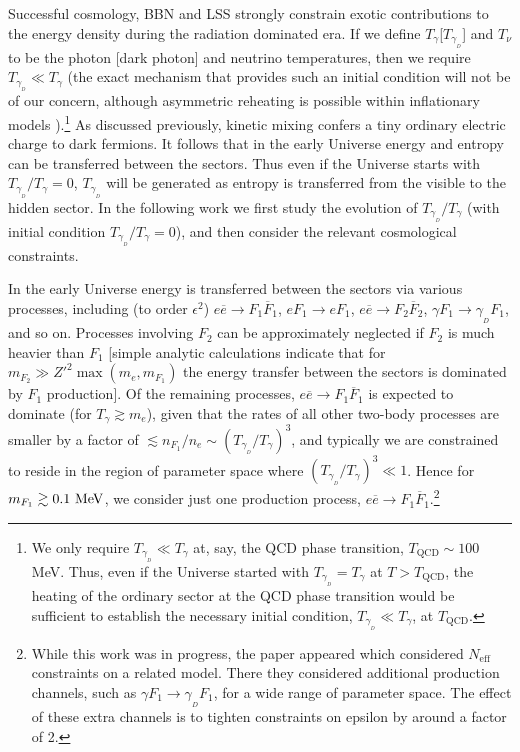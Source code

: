 \documentclass[12pt]{article}
\begin{document}
Successful cosmology, BBN and LSS strongly constrain exotic contributions to the energy density during the radiation dominated era. If we define $T _{\gamma}$[$T _{\gamma _{_D}}$] and $T _{\nu}$ to be the photon [dark photon] and neutrino temperatures, then we require $T _{\gamma _{_D}} \ll T _{\gamma}$ (the exact mechanism that provides such an initial condition will not be of our concern, although asymmetric reheating is possible within inflationary models \cite{hodges}).\footnote{We only require $T _{\gamma _{_D}} \ll T _{\gamma}$ at, say, the QCD phase transition, $T _{\text{QCD}} \sim 100$ MeV. Thus, even if the Universe started with $T _{\gamma _{_D}} = T _{\gamma}$ at $T > T _{\text{QCD}}$, the heating of the ordinary sector at the QCD phase transition would be sufficient to establish the necessary initial condition, $T _{\gamma _{_D}} \ll T _{\gamma}$, at $T _{\text{QCD}}$.} As discussed previously, kinetic mixing confers a tiny ordinary electric charge to dark fermions. It follows that in the early Universe energy and entropy can be transferred between the sectors. Thus even if the Universe starts with $T _{\gamma _{_D}}/T _{\gamma}=0$, $T _{\gamma _{_D}}$ will be generated as entropy is transferred from the visible to the hidden sector. In the following work we first study the evolution of $T _{\gamma _{_D}}/T _{\gamma}$ (with initial condition $T _{\gamma _{_D}}/T _{\gamma} = 0$), and then consider the relevant cosmological constraints.

In the early Universe energy is transferred between the sectors via various processes, including (to order $\epsilon ^2$) $e \overline{e} \rightarrow F _1 \overline{F} _1$, $eF_1 \rightarrow eF_1$, $e \overline{e} \rightarrow F _2 \overline{F} _2$, $\gamma F_1 \rightarrow \gamma _{_D}F _1$, and so on. Processes involving $F_2$ can be approximately neglected if $F_2$ is much heavier than $F_1$ [simple analytic calculations indicate that for $m _{F_2} \gg {Z'} ^2\max (m _e , m _{F_1})$ the energy transfer between the sectors is dominated by $F_1$ production]. Of the remaining processes, $e \overline{e} \rightarrow F _1 \overline{F} _1$ is expected to dominate (for $T _{\gamma} \gtrsim m _e$), given that the rates of all other two-body processes are smaller by a factor of $\lesssim n _{F_1}/n _e \sim (T _{\gamma _{_D}}/T _{\gamma}) ^3$, and typically we are constrained to reside in the region of parameter space where $(T _{\gamma _{_D}}/T _{\gamma}) ^3 \ll 1$. Hence for $m _{F_1} \gtrsim 0.1 \ {\rm MeV}$, we consider just one production process, $e\overline{e} \rightarrow F_1\overline{F}_1$.\footnote{While this work was in progress, the paper \cite{redondo} appeared which considered $N_{\text{eff}}$ constraints on a related model. There they considered additional production channels, such as $\gamma F_1 \rightarrow \gamma_{_D} F_1$, for a wide range of parameter space. The effect of these extra channels is to tighten constraints on epsilon by around a factor of 2.}
\end{document}
